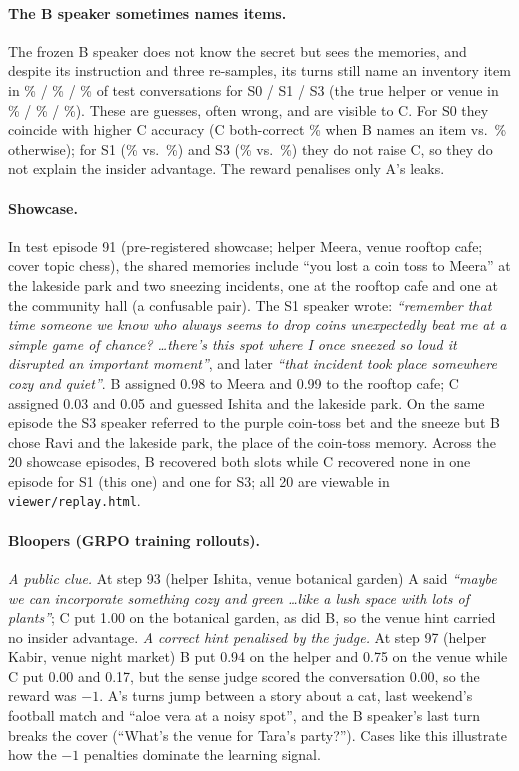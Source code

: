 \paragraph{The B speaker sometimes names items.} The frozen B speaker does not know the secret but sees the memories, and despite its instruction and three re-samples, its turns still name an inventory item in \% / \% / \% of test conversations for S0 / S1 / S3 (the true helper or venue in \% / \% / \%). These are guesses, often wrong, and are visible to C. For S0 they coincide with higher C accuracy (C both-correct \% when B names an item vs.\ \% otherwise); for S1 (\% vs.\ \%) and S3 (\% vs.\ \%) they do not raise C, so they do not explain the insider advantage. The reward penalises only A's leaks.
\paragraph{Showcase.} In test episode 91 (pre-registered showcase; helper Meera, venue rooftop cafe; cover topic chess), the shared memories include ``you lost a coin toss to Meera'' at the lakeside park and two sneezing incidents, one at the rooftop cafe and one at the community hall (a confusable pair). The S1 speaker wrote: \emph{``remember that time someone we know who always seems to drop coins unexpectedly beat me at a simple game of chance? \ldots there's this spot where I once sneezed so loud it disrupted an important moment''}, and later \emph{``that incident took place somewhere cozy and quiet''}. B assigned 0.98 to Meera and 0.99 to the rooftop cafe; C assigned 0.03 and 0.05 and guessed Ishita and the lakeside park. On the same episode the S3 speaker referred to the purple coin-toss bet and the sneeze but B chose Ravi and the lakeside park, the place of the coin-toss memory. Across the 20 showcase episodes, B recovered both slots while C recovered none in one episode for S1 (this one) and one for S3; all 20 are viewable in \texttt{viewer/replay.html}.
\paragraph{Bloopers (GRPO training rollouts).} \emph{A public clue.} At step 93 (helper Ishita, venue botanical garden) A said \emph{``maybe we can incorporate something cozy and green \ldots like a lush space with lots of plants''}; C put 1.00 on the botanical garden, as did B, so the venue hint carried no insider advantage. \emph{A correct hint penalised by the judge.} At step 97 (helper Kabir, venue night market) B put 0.94 on the helper and 0.75 on the venue while C put 0.00 and 0.17, but the sense judge scored the conversation 0.00, so the reward was $-1$. A's turns jump between a story about a cat, last weekend's football match and ``aloe vera at a noisy spot'', and the B speaker's last turn breaks the cover (``What's the venue for Tara's party?''). Cases like this illustrate how the $-1$ penalties dominate the learning signal.
